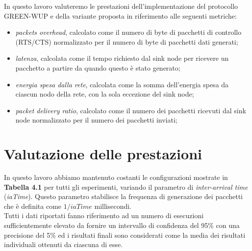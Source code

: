 \documentclass[binding=0.6cm,TFA]{sapthesis}
\begin{document}
In questo lavoro valuteremo le prestazioni dell'implementazione del protocollo GREEN-WUP e della variante proposta in riferimento alle seguenti metriche:

\vspace{0.3em}

\begin{itemize}
    \itemsep0em
    \item \emph{packets overhead}, calcolato come il numero di byte di pacchetti di controllo (RTS/CTS) normalizzato per il numero di byte di pacchetti dati generati;
    \item \emph{latenza}, calcolata come il tempo richiesto dal sink node per ricevere un pacchetto a partire da quando questo è stato generato;
    \item \emph{energia spesa dalla rete}, calcolata come la somma dell'energia spesa da ciascun nodo della rete, con la sola eccezione del sink node;
    \item \emph{packet delivery ratio}, calcolato come il numero dei pacchetti ricevuti dal sink node normalizzato per il numero dei pacchetti inviati;
  \end{itemize}

\section{Valutazione delle prestazioni}

In questo lavoro abbiamo mantenuto costanti le configurazioni mostrate in \textbf{Tabella 4.1} per tutti gli esperimenti, variando il parametro
di \emph{inter-arrival time} (\emph{iaTime}). Questo parametro stabilisce la frequenza di generazione dei pacchetti che è definita come
$1/iaTime$ millisecondi.\\

Tutti i dati riportati fanno riferimento ad un numero di esecuzioni sufficientemente elevato da fornire un intervallo di confidenza del 95\% con una precisione
del 5\% ed i risultati finali sono considerati come la media dei risultati individuali ottenuti da ciascuna di esse.
\end{document}
